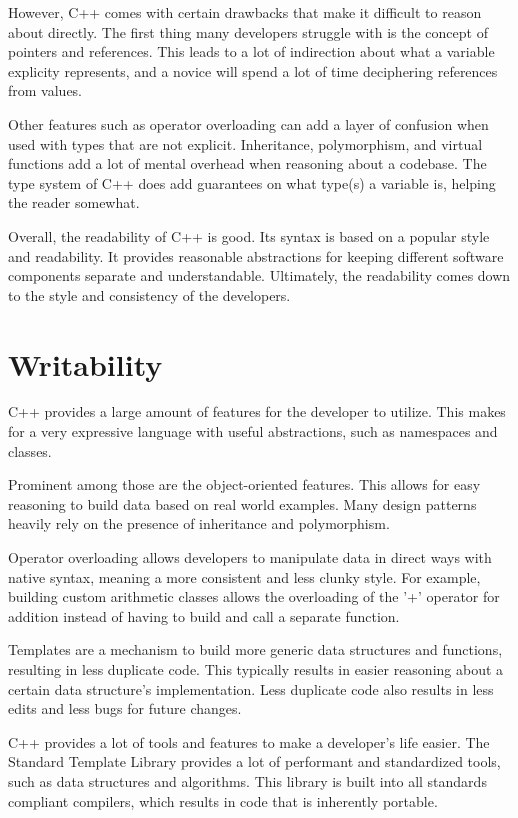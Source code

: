 \documentclass[12pt]{article}
\begin{document}
However, C++ comes with certain drawbacks that make it difficult to reason about directly.
The first thing many developers struggle with is the concept of pointers and references.
This leads to a lot of indirection about what a variable explicity represents, and a novice will spend a lot of time deciphering references from values.

Other features such as operator overloading can add a layer of confusion when used with types that are not explicit.
Inheritance, polymorphism, and virtual functions add a lot of mental overhead when reasoning about a codebase.
The type system of C++ does add guarantees on what type(s) a variable is, helping the reader somewhat.

Overall, the readability of C++ is good.
Its syntax is based on a popular style and readability.
It provides reasonable abstractions for keeping different software components separate and understandable.
Ultimately, the readability comes down to the style and consistency of the developers.


\section{Writability}

C++ provides a large amount of features for the developer to utilize.
This makes for a very expressive language with useful abstractions, such as namespaces and classes.

Prominent among those are the object-oriented features.
This allows for easy reasoning to build data based on real world examples.
Many design patterns heavily rely on the presence of inheritance and polymorphism.

Operator overloading allows developers to manipulate data in direct ways with native syntax, meaning a more consistent and less clunky style.
For example, building custom arithmetic classes allows the overloading of the '+' operator for addition instead of having to build and call a separate function.

Templates are a mechanism to build more generic data structures and functions, resulting in less duplicate code.
This typically results in easier reasoning about a certain data structure's implementation.
Less duplicate code also results in less edits and less bugs for future changes.

C++ provides a lot of tools and features to make a developer's life easier.
The Standard Template Library provides a lot of performant and standardized tools, such as data structures and algorithms.
This library is built into all standards compliant compilers, which results in code that is inherently portable.
\end{document}
